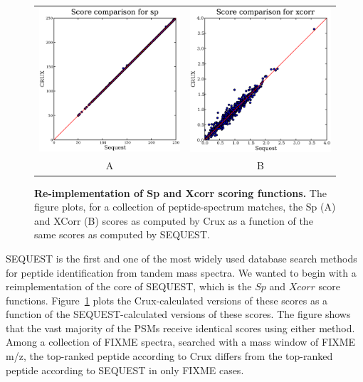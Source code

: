 \documentclass{bioinfo}
\begin{document}
\begin{figure}
  \centering
  \begin{tabular}{cc}
    \includegraphics[width=3in]{./Images/random-sp.eps} &
    \includegraphics[width=3in]{./Images/random-xcorr.eps} \\
  A & B \\
  \end{tabular}
  \caption{{\bf Re-implementation of Sp and Xcorr scoring functions.}
  The figure plots, for a collection of peptide-spectrum matches, the
  Sp (A) and XCorr (B) scores as computed by Crux as a function of the
  same scores as computed by SEQUEST.
  \label{figure:sp-xcorr}}
\end{figure}

SEQUEST is the first and one of the most widely used database search
methods for peptide identification from tandem mass spectra.  We
wanted to begin with a reimplementation of the core of SEQUEST, which
is the $Sp$ and $Xcorr$ score functions.  Figure~\ref{figure:sp-xcorr}
plots the Crux-calculated versions of these scores as a function of
the SEQUEST-calculated versions of these scores.  The figure shows
that the vast majority of the PSMs receive identical scores using
either method.  Among a collection of FIXME spectra, searched with a
mass window of FIXME m/z, the top-ranked peptide according to Crux
differs from the top-ranked peptide according to SEQUEST in only FIXME
cases.  
\end{document}
